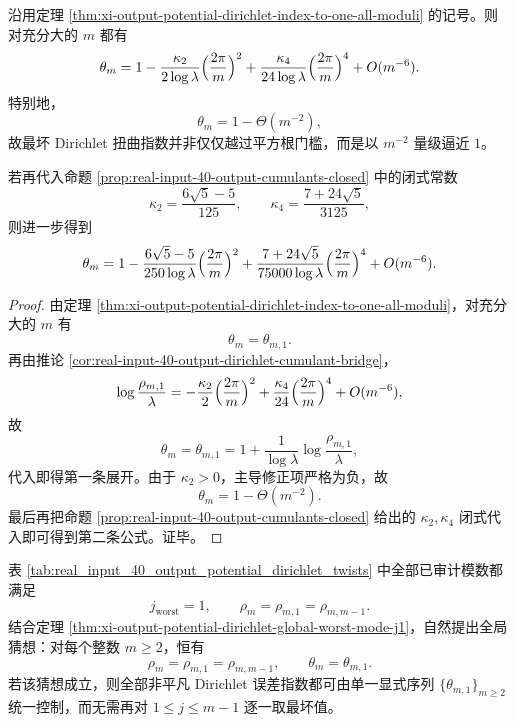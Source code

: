 \begin{corollary}\label{cor:xi-output-potential-dirichlet-index-expansion-all-moduli}
沿用定理 \ref{thm:xi-output-potential-dirichlet-index-to-one-all-moduli} 的记号。则对充分大的 \(m\) 都有
\[
\theta_m
=
1-\frac{\kappa_2}{2\log\lambda}\Bigl(\frac{2\pi}{m}\Bigr)^2
+\frac{\kappa_4}{24\log\lambda}\Bigl(\frac{2\pi}{m}\Bigr)^4
+O(m^{-6}).
\]
特别地，
\[
\theta_m=1-\Theta(m^{-2}),
\]
故最坏 Dirichlet 扭曲指数并非仅仅越过平方根门槛，而是以 \(m^{-2}\) 量级逼近 \(1\)。

若再代入命题 \ref{prop:real-input-40-output-cumulants-closed} 中的闭式常数
\[
\kappa_2=\frac{6\sqrt5-5}{125},
\qquad
\kappa_4=\frac{7+24\sqrt5}{3125},
\]
则进一步得到
\[
\theta_m
=
1-\frac{6\sqrt5-5}{250\log\lambda}\Bigl(\frac{2\pi}{m}\Bigr)^2
+\frac{7+24\sqrt5}{75000\log\lambda}\Bigl(\frac{2\pi}{m}\Bigr)^4
+O(m^{-6}).
\]
\end{corollary}
\begin{proof}
由定理 \ref{thm:xi-output-potential-dirichlet-index-to-one-all-moduli}，对充分大的 \(m\) 有
\[
\theta_m=\theta_{m,1}.
\]
再由推论 \ref{cor:real-input-40-output-dirichlet-cumulant-bridge}，
\[
\log\frac{\rho_{m,1}}{\lambda}
=
-\frac{\kappa_2}{2}\Bigl(\frac{2\pi}{m}\Bigr)^2
+\frac{\kappa_4}{24}\Bigl(\frac{2\pi}{m}\Bigr)^4
+O(m^{-6}),
\]
故
\[
\theta_m
=
\theta_{m,1}
=
1+\frac{1}{\log\lambda}\log\frac{\rho_{m,1}}{\lambda},
\]
代入即得第一条展开。由于 \(\kappa_2>0\)，主导修正项严格为负，故
\[
\theta_m=1-\Theta(m^{-2}).
\]
最后再把命题 \ref{prop:real-input-40-output-cumulants-closed} 给出的 \(\kappa_2,\kappa_4\) 闭式代入即可得到第二条公式。证毕。
\end{proof}

\begin{conjecture}[最坏单位根扭曲模态始终由基本频率给出]\label{conj:xi-output-potential-dirichlet-all-m-j1}
表 \ref{tab:real_input_40_output_potential_dirichlet_twists} 中全部已审计模数都满足
\[
j_{\mathrm{worst}}=1,
\qquad
\rho_m=\rho_{m,1}=\rho_{m,m-1}.
\]
结合定理 \ref{thm:xi-output-potential-dirichlet-global-worst-mode-j1}，自然提出全局猜想：对每个整数 \(m\ge 2\)，恒有
\[
\rho_m=\rho_{m,1}=\rho_{m,m-1},
\qquad
\theta_m=\theta_{m,1}.
\]
若该猜想成立，则全部非平凡 Dirichlet 误差指数都可由单一显式序列 \(\{\theta_{m,1}\}_{m\ge 2}\) 统一控制，而无需再对 \(1\le j\le m-1\) 逐一取最坏值。
\end{conjecture}
